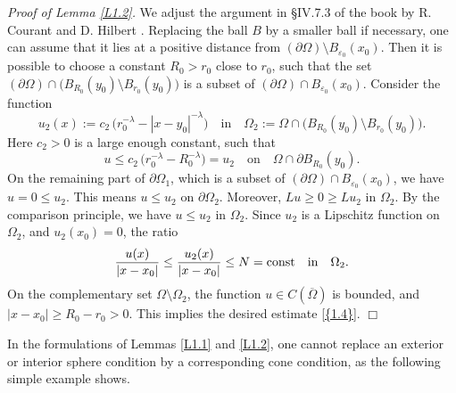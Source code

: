 \documentclass[regno,12pt]{amsart}
\theoremstyle{definition}
\theoremstyle{remark}
\begin{document}
\noindent
\emph{Proof of Lemma \ref{L1.2}.}
    We adjust the argument in \S IV.7.3 of the book by R. Courant and D. Hilbert \cite{CH}. Replacing the ball $B$ by a smaller ball if necessary, one can assume that it lies at a positive distance from $({\partial\Omega}){\setminus} B_{{\varepsilon}_0}(x_0)$. Then it is possible to choose a constant $R_0>r_0$ close to $r_0$, such that the set $({\partial\Omega})\cap \big(B_{R_0}(y_0){\setminus} B_{r_0}(y_0)\big)$ is a subset of $({\partial\Omega})\cap B_{{\varepsilon}_0}(x_0)$.
    Consider the function
    \[ u_2(x):=c_2\,\big(r_0^{-\lambda}-|x-y_0|^{-\lambda}\big)
    {\quad\text{{in}}\quad} \Omega_2:=\Omega\cap\big(B_{R_0}(y_0){\setminus} B_{r_0}(y_0)\big).\]
    Here $c_2>0$ is a large enough constant, such that
    \[ u\le c_2\,\big(r_0^{-\lambda}-R_0^{-\lambda}\big)=u_2
    {\quad\text{{on}}\quad} \Omega\cap {\partial} B_{R_0}(y_0).\]
    On the remaining part of ${\partial\Omega}_1$, which is a subset of $({\partial\Omega})\cap B_{{\varepsilon}_0}(x_0)$, we have $u=0\le u_2$. This means $u\le u_2$ on ${\partial\Omega}_2$. Moreover, $Lu\ge 0\ge Lu_2$ in $\Omega_2$.  By the comparison principle, we have $u\le u_2$ in $\Omega_2$. Since $u_2$ is a Lipschitz function on $\Omega_2$, and $u_2(x_0)=0$, the ratio
    \[ \frac{u(x)}{|x-x_0|}\le \frac{u_2(x)}{|x-x_0|}\le N={{\rm const}}
    {\quad\text{{in}}\quad} \Omega_2.\]
    On the complementary set $\Omega{\setminus} \Omega_2$, the function $u\in C({\overline{\Omega}})$ is bounded, and $|x-x_0|\ge R_0-r_0>0$. This implies the desired estimate {\eqref{{1.4}}}.
\hfill $\Box$
\medskip

In the formulations of Lemmas \ref{L1.1} and \ref{L1.2}, one cannot replace an exterior or interior sphere condition by a corresponding cone condition, as the following simple example shows.
\end{document}
